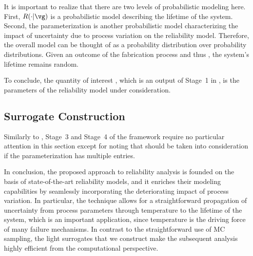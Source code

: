 \begin{remark} 
It is important to realize that there are two levels of probabilistic modeling
here. First, $R(\cdot | \vg)$ \perse is a probabilistic model describing the
lifetime \life of the system. Second, the parameterization \vg is another
probabilistic model characterizing the impact of uncertainty due to process
variation on the reliability model. Therefore, the overall model can be thought
of as a probability distribution over probability distributions. Given an
outcome of the fabrication process and thus \vg, the system's lifetime remains
random.
\end{remark}

To conclude, the quantity of interest \g, which is an output of Stage~1 in
, is the parameters \vg of the reliability model under
consideration.

\subsection{Surrogate Construction}

Similarly to , Stage~3 and Stage~4 of the
framework require no particular attention in this section except for noting that
 should be taken into consideration if the
parameterization \vg has multiple entries.

\conclusioncut
In conclusion, the proposed approach to reliability analysis is founded on the
basis of state-of-the-art reliability models, and it enriches their modeling
capabilities by seamlessly incorporating the deteriorating impact of process
variation. In particular, the technique allows for a straightforward propagation
of uncertainty from process parameters through temperature to the lifetime of
the system, which is an important application, since temperature is the driving
force of many failure mechanisms. In contrast to the straightforward use of
\ac{MC} sampling, the light surrogates that we construct make the subsequent
analysis highly efficient from the computational perspective.
